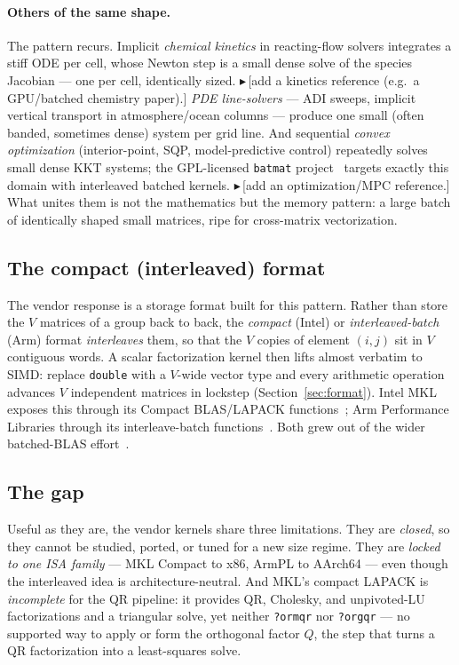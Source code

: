 \documentclass[11pt]{article}
\newif\ifdraftmode \draftmodetrue
\newcommand{\draftnote}[1]{\ifdraftmode{\textcolor{orange!85!black}{\small$\blacktriangleright$\,\textsf{[#1]}}}\fi}
\newcommand{\code}[1]{\texttt{#1}}
\begin{document}
\paragraph{Others of the same shape.}
The pattern recurs. Implicit \emph{chemical kinetics} in reacting-flow solvers
integrates a stiff ODE per cell, whose Newton step is a small dense solve of the
species Jacobian --- one per cell, identically sized.
\draftnote{add a kinetics reference (e.g.\ a GPU/batched chemistry paper).}
\emph{PDE line-solvers} --- ADI sweeps, implicit vertical transport in
atmosphere/ocean columns --- produce one small (often banded, sometimes dense)
system per grid line. And sequential \emph{convex optimization} (interior-point,
SQP, model-predictive control) repeatedly solves small dense KKT systems; the
GPL-licensed \code{batmat} project~\cite{batmat} targets exactly this domain with
interleaved batched kernels.
\draftnote{add an optimization/MPC reference.}
What unites them is not the mathematics but the memory pattern: a large batch of
identically shaped small matrices, ripe for cross-matrix vectorization.

\subsection{The compact (interleaved) format}
The vendor response is a storage format built for this pattern. Rather than
store the $V$ matrices of a group back to back, the \emph{compact} (Intel) or
\emph{interleaved-batch} (Arm) format \emph{interleaves} them, so that the $V$
copies of element $(i,j)$ sit in $V$ contiguous words. A scalar factorization
kernel then lifts almost verbatim to SIMD: replace \code{double} with a
$V$-wide vector type and every arithmetic operation advances $V$ independent
matrices in lockstep (Section~\ref{sec:format}). Intel MKL exposes this through
its Compact BLAS/LAPACK functions~\cite{mkl-compact}; Arm Performance Libraries
through its interleave-batch functions~\cite{armpl-interleave}. Both grew out of
the wider batched-BLAS effort~\cite{bblas2021,bblas-standard}.

\subsection{The gap}
Useful as they are, the vendor kernels share three limitations. They are
\emph{closed}, so they cannot be studied, ported, or tuned for a new size regime.
They are \emph{locked to one ISA family} --- MKL Compact to x86, ArmPL to
AArch64 --- even though the interleaved idea is architecture-neutral. And MKL's
compact LAPACK is \emph{incomplete} for the QR pipeline: it provides QR,
Cholesky, and unpivoted-LU factorizations and a triangular solve, yet neither
\code{?ormqr} nor \code{?orgqr} --- no supported way to apply or form the
orthogonal factor $Q$, the step that turns a QR factorization into a
least-squares solve.
\end{document}
